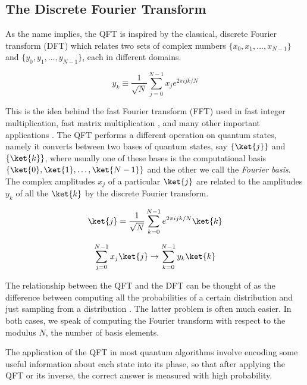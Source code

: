 \subsection{The Discrete Fourier Transform}

As the name implies, the QFT is inspired by the classical, discrete
Fourier transform (DFT) which relates two sets of complex numbers
$\{x_0, x_1, \ldots, x_{N-1}\}$ and $\{y_0, y_1, \ldots, y_{N-1}\}$,
each in different domains.

\begin{equation}
y_k \equiv \frac{1}{\sqrt{N}} \sum_{j=0}^{N-1} x_j e^{2\pi i j k / N}
\end{equation}

This is the idea behind the fast Fourier transform (FFT) \cite{Cooley1965}
used in fast
integer multiplication, fast matrix multiplication \cite{Schoenhage1971},
and many other
important applications \cite{Maslen1997}. The QFT performs a different
operation on quantum states, namely it converts between two bases of
quantum states,
say $\{\ket{j}\}$ and $\{\ket{k}\}$, where usually one of these bases is
the computational basis $\{\ket{0}, \ket{1}, \ldots, \ket{N-1}\}$
and the other we call the \emph{Fourier basis}. The complex amplitudes
$x_j$ of a
particular $\ket{j}$ are related to the amplitudes $y_k$ of all the $\ket{k}$
by the discrete Fourier transform.

\begin{equation}
\ket{j} = \frac{1}{\sqrt{N}} \sum_{k=0}^{N-1} e^{2\pi i j k / N} \ket{k}
\end{equation}

\begin{equation}
\sum_{j=0}^{N-1} x_j \ket{j} \rightarrow \sum_{k=0}^{N-1} y_k \ket{k}
\end{equation}

The relationship between the QFT and the DFT can be thought of as the
difference between computing all the probabilities of a certain distribution
and just sampling from a distribution \cite{Cleve2000}. The latter problem is
often much easier. In both cases, we speak of computing the Fourier transform
with respect to the modulus $N$, the number of basis elements.

The application of the QFT in most quantum algorithms
involve encoding some useful information about each state into its phase,
so that after applying the QFT or its inverse, the correct answer is measured
with high probability.


